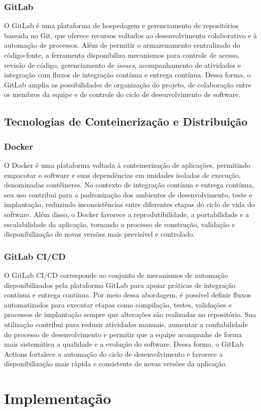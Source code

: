 \documentclass[grad,pdftex]{poli}
\begin{document}
\subsection{GitLab}

O GitLab é uma plataforma de hospedagem e gerenciamento de repositórios baseada no Git, que oferece recursos voltados ao desenvolvimento colaborativo e à automação de processos. Além de permitir o armazenamento centralizado do código-fonte, a ferramenta disponibiliza mecanismos para controle de acesso, revisão de código, gerenciamento de \textit{issues}, acompanhamento de atividades e integração com fluxos de integração contínua e entrega contínua. Dessa forma, o GitLab amplia as possibilidades de organização do projeto, de colaboração entre os membros da equipe e de controle do ciclo de desenvolvimento de software.

\section{Tecnologias de Conteinerização e Distribuição}

\subsection{Docker}

O Docker é uma plataforma voltada à conteinerização de aplicações, permitindo empacotar o software e suas dependências em unidades isoladas de execução, denominadas contêineres. No contexto de integração contínua e entrega contínua, seu uso contribui para a padronização dos ambientes de desenvolvimento, teste e implantação, reduzindo inconsistências entre diferentes etapas do ciclo de vida do software. Além disso, o Docker favorece a reprodutibilidade, a portabilidade e a escalabilidade da aplicação, tornando o processo de construção, validação e disponibilização de novas versões mais previsível e controlado.

\subsection{GitLab CI/CD}
O GitLab CI/CD corresponde ao conjunto de mecanismos de automação disponibilizados pela plataforma GitLab para apoiar práticas de integração contínua e entrega contínua. Por meio dessa abordagem, é possível definir fluxos automatizados para executar etapas como compilação, testes, validações e processos de implantação sempre que alterações são realizadas no repositório. Sua utilização contribui para reduzir atividades manuais, aumentar a confiabilidade do processo de desenvolvimento e permitir que a equipe acompanhe de forma mais sistemática a qualidade e a evolução do software. Dessa forma, o GitLab Actions fortalece a automação do ciclo de desenvolvimento e favorece a disponibilização mais rápida e consistente de novas versões da aplicação.\clearpage{}    
    \clearpage{}\chapter{Implementação}
\label{chap5}
\end{document}

